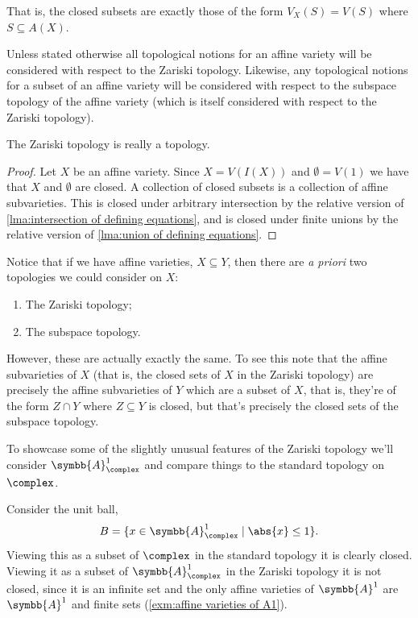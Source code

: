 \documentclass[fleqn]{NotesClass}
\newcommand{\affine}{\symbb{A}}
\begin{document}
    That is, the closed subsets are exactly those of the form \(V_X(S) = V(S)\) where \(S \subseteq A(X)\).
    
    Unless stated otherwise all topological notions for an affine variety will be considered with respect to the Zariski topology.
    Likewise, any topological notions for a subset of an affine variety will be considered with respect to the subspace topology of the affine variety (which is itself considered with respect to the Zariski topology).
    
    \begin{lma}{}{}
        The Zariski topology is really a topology.
        \begin{proof}
            Let \(X\) be an affine variety.
            Since \(X = V(I(X))\) and \(\emptyset = V(1)\) we have that \(X\) and \(\emptyset\) are closed.
            A collection of closed subsets is a collection of affine subvarieties.
            This is closed under arbitrary intersection by the relative version of \cref{lma:intersection of defining equations}, and is closed under finite unions by the relative version of \cref{lma:union of defining equations}.
        \end{proof}
    \end{lma}
    
    Notice that if we have affine varieties, \(X \subseteq Y\), then there are \textit{a priori} two topologies we could consider on \(X\):
    \begin{enumerate}
        \item The Zariski topology;
        \item The subspace topology.
    \end{enumerate}
    However, these are actually exactly the same.
    To see this note that the affine subvarieties of \(X\) (that is, the closed sets of \(X\) in the Zariski topology) are precisely the affine subvarieties of \(Y\) which are a subset of \(X\), that is, they're of the form \(Z \cap Y\) where \(Z \subseteq Y\) is closed, but that's precisely the closed sets of the subspace topology.
    
    To showcase some of the slightly unusual features of the Zariski topology we'll consider \(\affine_{\complex}^1\) and compare things to the standard topology on \(\complex\).
    
    \begin{exm}{}{}
        Consider the unit ball,
        \begin{equation}
            B = \{x \in \affine_{\complex}^1 \mid \abs{x} \le 1\}.
        \end{equation}
        Viewing this as a subset of \(\complex\) in the standard topology it is clearly closed.
        Viewing it as a subset of \(\affine_{\complex}^1\) in the Zariski topology it is not closed, since it is an infinite set and the only affine varieties of \(\affine^1\) are \(\affine^1\) and finite sets (\cref{exm:affine varieties of A1}).
    \end{exm}
    
\end{document}
